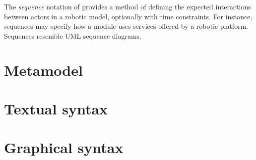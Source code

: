 
The \emph{sequence} notation of \langname{} provides a method of
defining the expected interactions between actors in a robotic model,
optionally with time constraints.  For instance, sequences may specify
how a \robochart{} module uses services offered by a robotic platform.
Sequences resemble UML sequence diagrams.

\chapter{Metamodel}\label{cha:metamodel}


\chapter{Textual syntax}\label{cha:seq-textual}


\chapter{Graphical syntax}\label{cha:seq-graphical}


